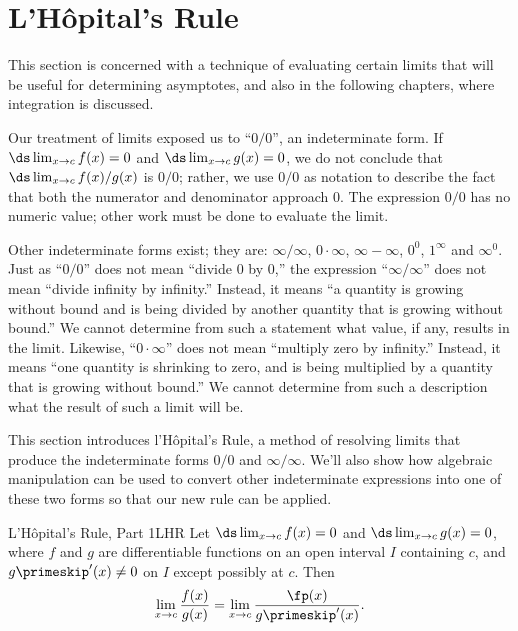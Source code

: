 \section{L'H\^opital's Rule}\label{sec:LH}\label{sec:lhopitals_rule}

This section is concerned with a technique of evaluating certain limits that will be useful for determining asymptotes, and also in the following chapters, where integration is discussed.

Our treatment of limits exposed us to ``$ 0/0 $'', an indeterminate form. If $\ds \lim_{x\to c}f(x)=0$ and $\ds \lim_{x\to c} g(x) =0$, we do not conclude that $\ds \lim_{x\to c} f(x)/g(x)$ is $0/0$; rather, we use $0/0$ as notation to describe the fact that both the numerator and denominator approach $ 0 $. The expression $ 0/0 $ has no numeric value; other work must be done to evaluate the limit.


Other indeterminate forms exist; they are: %
 $\infty/\infty$, $0\cdot\infty$, $\infty-\infty$, $0^0$, $1^\infty$ and $\infty^0$. %
 Just as ``$ 0/0 $'' does not mean ``divide $ 0 $ by $ 0 $,'' the expression ``$\infty/\infty$'' does not mean ``divide infinity by infinity.'' Instead, it means ``a quantity is growing without bound and is being divided by another quantity that is growing without bound.'' We cannot determine from such a statement what value, if any, results in the limit. Likewise, ``$0\cdot \infty$'' does not mean ``multiply zero by infinity.'' Instead, it means ``one quantity is shrinking to zero, and is being multiplied by a quantity that is growing without bound.'' We cannot determine from such a description what the result of such a limit will be.

This section introduces l'H\^opital's Rule, a method of resolving limits that produce the indeterminate forms $ 0/0 $ and $\infty/\infty$. We'll also show how algebraic manipulation can be used to convert other indeterminate expressions into one of these two forms so that our new rule can be applied.

\begin{theorem}{L'H\^opital's Rule, Part 1}{LHR}
{Let $\ds \lim_{x\to c}f(x) = 0$ and $\ds \lim_{x\to c}g(x)=0$, where $f$ and $g$ are differentiable functions on an open interval $I$ containing $c$, and $g\primeskip'(x)\neq 0$ on $I$ except possibly at $c$. Then 
$$ \lim_{x\to c} \frac{f(x)}{g(x)} = \lim_{x\to c} \frac{\fp(x)}{g\primeskip'(x)}.$$
}
\end{theorem}

